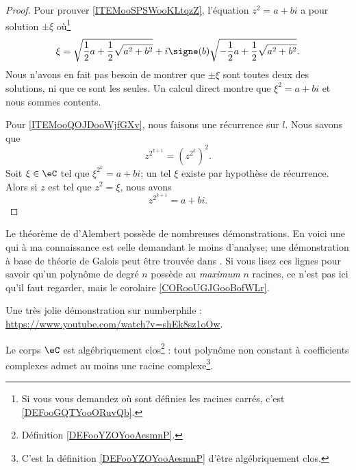 \begin{proof}
	Pour prouver \ref{ITEMooSPSWooKLtqzZ}, l'équation \( z^2=a+bi\) a pour solution \( \pm\xi\) où\footnote{Si vous vous demandez où sont définies les racines carrés, c'est \ref{DEFooGQTYooORuvQb}.}
	\begin{equation}
		\xi=\sqrt{ \frac{ 1 }{2}a+\frac{ 1 }{2}\sqrt{ a^2+b^2 } }+i\signe(b)\sqrt{ -\frac{ 1 }{2}a+\frac{ 1 }{2}\sqrt{ a^2+b^2 } }.
	\end{equation}
	Nous n'avons en fait pas besoin de montrer que \( \pm\xi\) sont toutes deux des solutions, ni que ce sont les seules. Un calcul direct montre que \( \xi^2=a+bi\) et nous sommes contents.

	Pour \ref{ITEMooQOJDooWjfGXv}, nous faisons une récurrence sur \( l\). Nous savons que
	\begin{equation}
		z^{2^{k+1}}=(z^{2^k})^2.
	\end{equation}
	Soit \( \xi\in \eC\) tel que \( \xi^{2^k}=a+bi\); un tel \( \xi\) existe par hypothèse de récurrence. Alors si \( z\) est tel que \( z^2=\xi\), nous avons
	\begin{equation}
		z^{2^{k+1}}=a+bi.
	\end{equation}
\end{proof}

Le théorème de d'Alembert possède de nombreuses démonstrations. En voici une qui à ma connaissance est celle demandant le moins d'analyse; une démonstration à base de théorie de Galois peut être trouvée dans \cite{rqrNyg,ooPSLMooAVODjn}. Si vous lisez ces lignes pour savoir qu'un polynôme de degré \( n\) possède au \emph{maximum} \( n\) racines, ce n'est pas ici qu'il faut regarder, mais le corolaire \ref{CORooUGJGooBofWLr}.

Une très jolie démonstration sur numberphile :\\ \url{https://www.youtube.com/watch?v=shEk8sz1oOw}.

\begin{theorem}   \label{THOooIRJYooBiHRyW}
	Le corps \( \eC\) est algébriquement clos\footnote{Définition \ref{DEFooYZOYooAesmnP}.} : tout polynôme non constant à coefficients complexes admet au moins une racine complexe\footnote{C'est la définition \ref{DEFooYZOYooAesmnP} d'être algébriquement clos.}.
\end{theorem}


